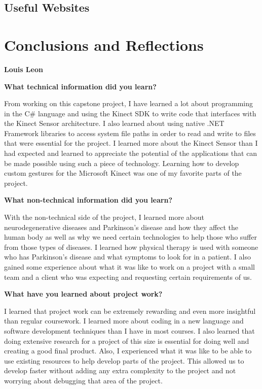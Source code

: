\documentclass[onecolumn, draftclsnofoot,10pt, compsoc]{IEEEtran}
\begin{document}
\subsection{Useful Websites}

\section{Conclusions and Reflections}
\begin{flushleft}
{\large\textbf{Louis Leon}\par}
\textbf{What technical information did you learn?}\par
From working on this capstone project, I have learned a lot about programming in the C\# language and using the Kinect SDK to write code that interfaces with the Kinect Sensor architecture. I also learned about using native .NET Framework libraries to access system file paths in order to read and write to files that were essential for the project. I learned more about the Kinect Sensor than I had expected and learned to appreciate the potential of the applications that can be made possible using such a piece of technology. Learning how to develop custom gestures for the Microsoft Kinect was one of my favorite parts of the project. 

\textbf{What non-technical information did you learn?}\par
With the non-technical side of the project, I learned more about neurodegenerative diseases and Parkinson's disease and how they affect the human body as well as why we need certain technologies to help those who suffer from those types of diseases. I learned how physical therapy is used with someone who has Parkinson's disease and what symptoms to look for in a patient. I also gained some experience about what it was like to work on a project with a small team and a client who was expecting and requesting certain requirements of us.

\textbf{What have you learned about project work?}\par
I learned that project work can be extremely rewarding and even more insightful than regular coursework. I learned more about coding in a new language and software development techniques than I have in most courses. I also learned that doing extensive research for a project of this size is essential for doing well and creating a good final product. Also, I experienced what it was like to be able to use existing resources to help develop parts of the project. This allowed us to develop faster without adding any extra complexity to the project and not worrying about debugging that area of the project.


\end{flushleft}
\end{document}
